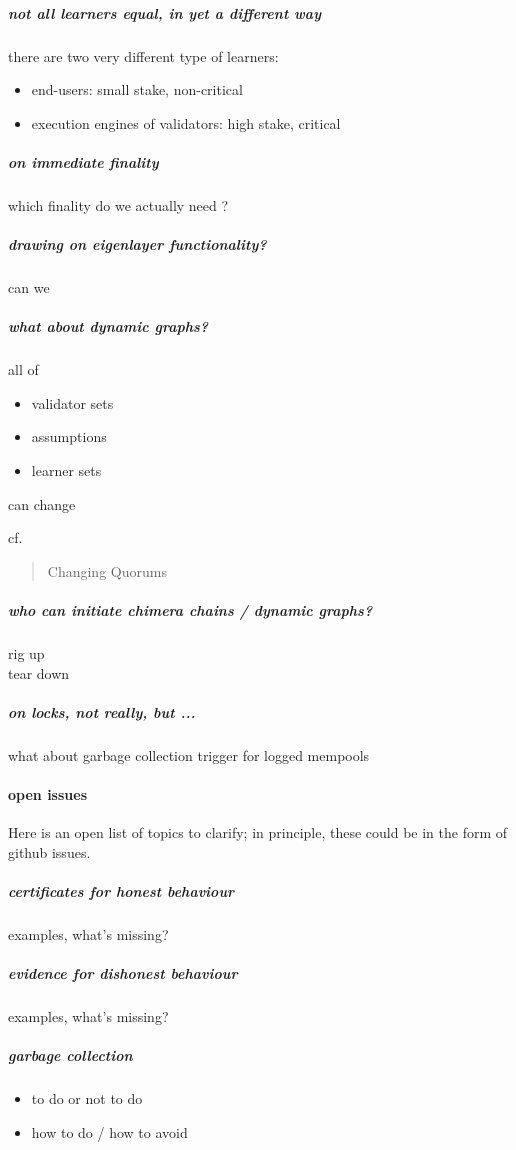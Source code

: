 \documentclass{article}
\theoremstyle{definition}
\begin{document}
\subparagraph{not all learners equal, in yet a different way}

there are two very different type of learners:
\begin{itemize}
\item end-users: small stake, non-critical
\item execution engines of validators: high stake, critical
\end{itemize}




\subparagraph{on immediate finality}
which finality do we actually need ?

\subparagraph{drawing on eigenlayer functionality?}
can we

\subparagraph{what about dynamic graphs?}
all of
\begin{itemize}
\item validator sets  
\item assumptions 
\item learner sets
\end{itemize}
can change

cf.
\begin{quote}
   Changing Quorums
\end{quote}

\subparagraph{who can initiate chimera chains / dynamic graphs?}
\begin{description}
\item[rig up] 
\item[tear down] 
\end{description}

\subparagraph{%
  on locks, not really, but ... 
}
what about garbage collection trigger 
for logged mempools




\paragraph{open issues}
Here is an open list of topics to clarify;
in principle, 
these could be in the form of github issues. 

\subparagraph{certificates for honest behaviour}
examples, what's missing?

\subparagraph{evidence for dishonest behaviour}
examples, what's missing?

\subparagraph{garbage collection}
\begin{itemize}
\item to do or not to do
\item how to do / how to avoid 
\end{itemize}
\end{document}
